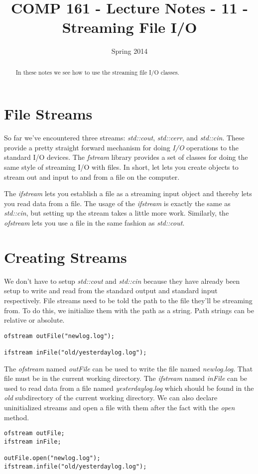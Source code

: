 \documentclass[]{tufte-handout}
\title{COMP 161 - Lecture Notes - 11 - Streaming File I/O}
\date{Spring 2014}
\begin{document}
 
\maketitle

\begin{abstract}
In these notes we see how to use the streaming file I/O classes. 
\end{abstract}

\section{File Streams}

So far we've encountered three streams: \textit{std::cout}, \textit{std::cerr}, and \textit{std::cin}.  These provide a pretty straight forward mechanism for doing \textit{I/O} operations to the standard I/O devices.  The \textit{fstream} library provides a set of classes for doing the same style of streaming I/O with files.  In short, let lets you create objects to stream out and input to and from a file on the computer.  

The \textit{ifstream} lets you establish a file as a streaming input object and thereby lets you read data from a file.  The usage of the \textit{ifstream} is exactly the same as \textit{std::cin}, but setting up the stream takes a little more work. Similarly, the \textit{ofstream} lets you use a file in the same fashion as \textit{std::cout}.

\section{Creating Streams}

We don't have to setup \textit{std::cout} and \textit{std::cin} because they have already been setup to write and read from the standard output and standard input respectively. File streams need to be told the path to the file they'll be streaming from.  To do this, we initialize them with the path as a string. Path strings can be relative or absolute.
\begin{verbatim}
ofstream outFile("newlog.log");

ifstream inFile("old/yesterdaylog.log");
\end{verbatim}
The \textit{ofstream} named \textit{outFile} can be used to write the file named \textit{newlog.log}.  That file must be in the current working directory. The \textit{ifstream} named \textit{inFile} can be used to read data from a file named \textit{yesterdaylog.log} which should be found in the \textit{old} subdirectory of the current working directory. We can also declare uninitialized streams and open a file with them after the fact with the \textit{open } method.
\begin{verbatim}
ofstream outFile;
ifstream inFile;

outFile.open("newlog.log");
ifstream.infile("old/yesterdaylog.log");
\end{verbatim}
\end{document}
